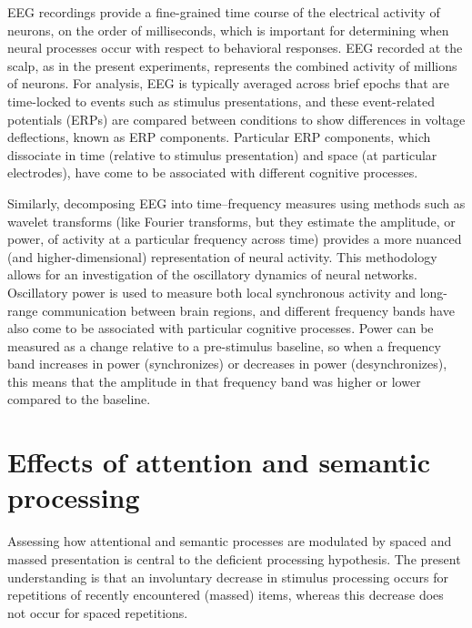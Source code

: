 EEG recordings provide a fine-grained time course of the electrical
activity of neurons, on the order of milliseconds, which is important
for determining when neural processes occur with respect to behavioral
responses.  EEG recorded at the scalp, as in the present experiments, represents the combined activity of millions of neurons.  For analysis, EEG is typically averaged across brief
epochs that are time-locked to events such as stimulus presentations,
and these event-related potentials (ERPs) are compared between
conditions to show differences in voltage deflections, known as ERP
components.  Particular ERP components, which dissociate in time
(relative to stimulus presentation) and space (at particular
electrodes), have come to be associated with different cognitive processes.

Similarly, decomposing EEG into time--frequency measures using methods such as wavelet transforms
(like Fourier transforms, but they estimate the amplitude, or power, of
activity at a particular frequency across time) provides a more
nuanced (and higher-dimensional) representation of neural activity.
This methodology allows for an investigation of the oscillatory dynamics of neural
networks.  Oscillatory power is used to measure both local synchronous
activity and long-range communication between brain regions, and
different frequency bands have also come to be associated with particular
cognitive processes.  Power can be measured as a change relative to a pre-stimulus baseline, so when a frequency band increases in power (synchronizes) or decreases in power (desynchronizes), this means that the amplitude in that frequency band was higher or lower compared to the baseline.


\section{Effects of attention and semantic processing}


Assessing how attentional and semantic processes are modulated by spaced and massed presentation is central to the deficient processing hypothesis.
The present understanding is that an involuntary decrease in stimulus processing occurs for repetitions of recently encountered (massed) items, whereas this decrease does not occur for spaced repetitions.

